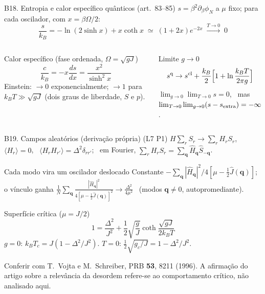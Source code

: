 \documentclass[10pt,aspectratio=169]{beamer}
\newcommand{\lista}[1]{\textcolor{qcdGreen!70!black}{\small(#1)}}
\newcommand{\eq}[1]{\textcolor{qcdBlue!70!black}{\small(#1)}}
\begin{document}
\begin{frame}{B18. Entropia e calor específico quânticos \eq{art.~83--85}}
  \small
  $s=\beta^2\partial_\beta\phi_N$ a $\mu$ fixo; para cada oscilador, com $x=\beta\Omega/2$:
  \[\frac s{k_B}=-\ln(2\sinh x)+x\coth x\;\simeq\;(1+2x)e^{-2x}\;\xrightarrow{T\to0}\;0\]
  \begin{columns}[T]
    \begin{block}{Calor específico (fase ordenada, $\Omega=\sqrt{gJ}$)}
      \[\frac c{k_B}=-x\frac{ds}{dx}=\frac{x^2}{\sinh^2x}\]
      Einstein: $\to0$ exponencialmente; $\to1$ para $k_BT\gg\sqrt{gJ}$ (dois graus de liberdade, $S$ e $p$).
    \end{block}
    \begin{block}{Limite $g\to0$}
      \[s^{\rm q}\to s^{\rm cl}+\frac{k_B}2\Big[1+\ln\frac{k_BT}{2\pi g}\Big]\]
      $\lim_{g\to0}\lim_{T\to0}s=0$, \ mas $\lim_{T\to0}\lim_{g\to0}(s-s_{\rm extra})=-\infty$.
    \end{block}
  \end{columns}
\end{frame}

\begin{frame}{B19. Campos aleatórios (derivação própria) \lista{L7 P1}}
  \small
  $H\sum_rS_r\to\sum_rH_rS_r$, \ $\langle H_r\rangle=0$, \ $\langle H_rH_{r'}\rangle=\Delta^2\delta_{rr'}$; \
  em Fourier, $\sum_rH_rS_r=\sum_{\mathbf q}\hat H_{\mathbf q}\hat S_{-\mathbf q}$.
  \begin{block}{Cada modo vira um oscilador deslocado}
    Constante $-\sum_{\mathbf q}|\hat H_{\mathbf q}|^2/4[\mu-\frac12\hat J(\mathbf q)]$; o vínculo ganha
    $\frac1N\sum_{\mathbf q}\frac{|\hat H_{\mathbf q}|^2}{4[\mu-\frac12\hat J(\mathbf q)]^2}\to\frac{\Delta^2}{4\mu^2}$ \ (modos $\mathbf q\neq0$, autopromediante).
  \end{block}
  \begin{block}{Superfície crítica ($\mu=J/2$)}
    \[1=\frac{\Delta^2}{J^2}+\frac12\sqrt{\frac gJ}\coth\frac{\sqrt{gJ}}{2k_BT}\]
    $g=0$: $k_BT_c=J(1-\Delta^2/J^2)$. \quad $T=0$: $\frac12\sqrt{g_c/J}=1-\Delta^2/J^2$.
  \end{block}
  {\footnotesize Conferir com T.~Vojta e M.~Schreiber, PRB \textbf{53}, 8211 (1996).
  A afirmação do artigo sobre a relevância da desordem refere-se ao comportamento crítico, não analisado aqui.}
\end{frame}
\end{document}
